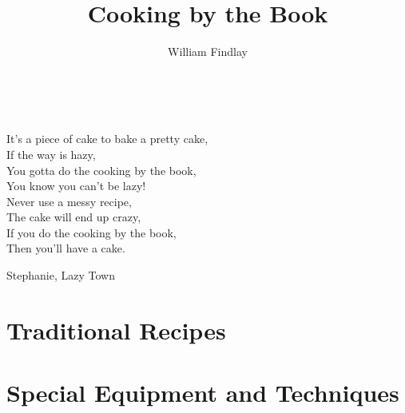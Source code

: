 \documentclass[a4paper,11pt]{memoir}
\title{Cooking by the Book}
\author{William Findlay}
\begin{document}
\maketitle
\thispagestyle{empty}
\newpage
\setcounter{page}{1}

{
  \hypersetup{linkcolor=black}
  \tableofcontents
}

\newpage
\thispagestyle{empty}
\
\vfill
\begin{minipage}{0.7\textwidth}
\epigraph{
It's a piece of cake to bake a pretty cake,\\
If the way is hazy,\\
You gotta do the cooking by the book,\\
You know you can't be lazy!\\
Never use a messy recipe,\\
The cake will end up crazy,\\
If you do the cooking by the book,\\
Then you'll have a cake.}{Stephanie, Lazy Town}
\end{minipage}
\vfill
\newpage

\setcounter{page}{1}


\part{Traditional Recipes}



\part{Special Equipment and Techniques}





\end{document}
